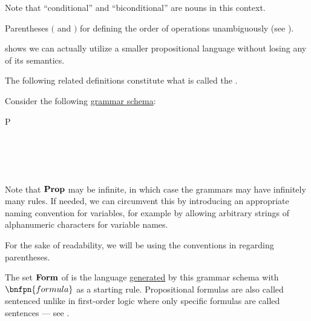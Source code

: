 \begin{definition}
\begin{thmenum}
     Note that \enquote{conditional} and \enquote{biconditional} are nouns in this context.

     Parentheses \( ( \) and \( ) \) for defining the order of operations unambiguously (see ).
  \end{thmenum}

   shows we can actually utilize a smaller propositional language without losing any of its semantics.
\end{definition}

\begin{definition}\label{def:propositional_syntax}
  The following related definitions constitute what is called the .

  \begin{thmenum}
     Consider the following \hyperref[def:backus_naur_form]{grammar schema}:
    \begin{bnf*}
         {P \in {}} \\
       {\circ \in \Sigma} \\
          { \bnfor} \\
      \bnfmore             {\bnfts{\( \top \)} \bnfor \bnfts{\( \bot \)} \bnfor} \\
       \\
    \end{bnf*}

    Note that \( \operatorname{\mathbf{Prop}} \) may be infinite, in which case the grammars may have infinitely many rules. If needed, we can circumvent this by introducing an appropriate naming convention for variables, for example by allowing arbitrary strings of alphanumeric characters for variable names.

    For the sake of readability, we will be using the conventions in  regarding parentheses.

     The set \( \operatorname{\mathbf{Form}} \) of  is the language \hyperref[def:grammar_derivation/grammar_language]{generated} by this grammar schema with \( \bnfpn{formula} \) as a starting rule. Propositional formulas are also called sentenced unlike in first-order logic where only specific formulas are called sentences --- see .


\end{thmenum}
\end{definition}
